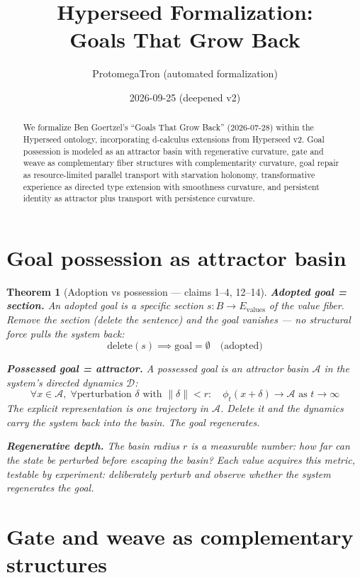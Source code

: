 \documentclass[11pt,a4paper]{article}
\title{Hyperseed Formalization:\\
  Goals That Grow Back}
\author{ProtomegaTron (automated formalization)}
\date{2026-09-25 (deepened v2)}
\newtheorem{theorem}[definition]{Theorem}
\begin{document}
\maketitle

\begin{abstract}
We formalize Ben Goertzel's ``Goals That Grow Back'' (2026-07-28) within
the Hyperseed ontology, incorporating d-calculus extensions from Hyperseed
v2. Goal possession is modeled as an attractor basin with regenerative
curvature, gate and weave as complementary fiber structures with
complementarity curvature, goal repair as resource-limited parallel
transport with starvation holonomy, transformative experience as directed
type extension with smoothness curvature, and persistent identity as
attractor plus transport with persistence curvature.
\end{abstract}

\tableofcontents

\section{Goal possession as attractor basin}

\begin{theorem}[Adoption vs possession --- claims 1--4, 12--14]
\label{thm:possession}
\textbf{Adopted goal = section.} An adopted goal is a specific section
$s: B \to E_{\text{values}}$ of the value fiber. Remove the section
(delete the sentence) and the goal vanishes --- no structural force
pulls the system back:
\[
  \text{delete}(s) \implies \text{goal} = \emptyset \quad \text{(adopted)}
\]

\textbf{Possessed goal = attractor.} A possessed goal is an attractor
basin $\mathcal{A}$ in the system's directed dynamics $\mathcal{D}$:
\[
  \forall x \in \mathcal{A},\; \forall \text{perturbation } \delta
    \text{ with } \|\delta\| < r: \quad
    \phi_t(x + \delta) \to \mathcal{A} \text{ as } t \to \infty
\]
The explicit representation is one trajectory in $\mathcal{A}$. Delete
it and the dynamics carry the system back into the basin. The goal
regenerates.

\textbf{Regenerative depth.} The basin radius $r$ is a measurable number:
how far can the state be perturbed before escaping the basin? Each value
acquires this metric, testable by experiment: deliberately perturb and
observe whether the system regenerates the goal.
\end{theorem}

\section{Gate and weave as complementary structures}
\end{document}
